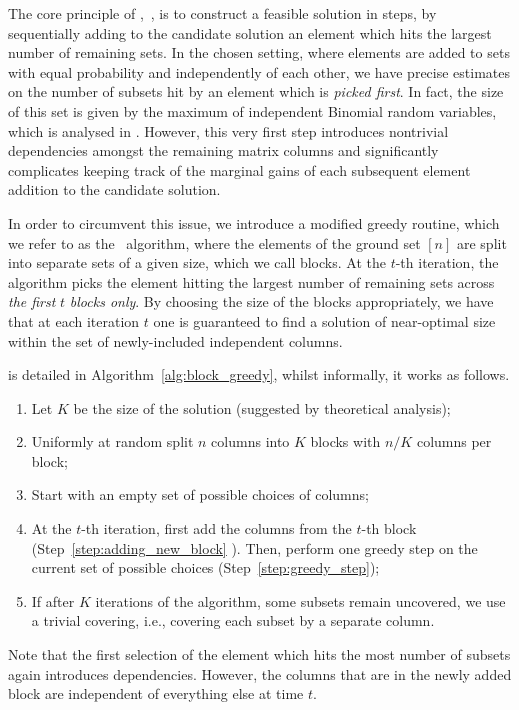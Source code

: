 The core principle of \greedy,~, is to construct a feasible solution in steps, by sequentially adding to the candidate solution an element which hits the largest number of remaining sets. 
In the chosen setting, where elements are added to sets with equal probability and independently of each other, we have precise estimates on the number of subsets hit by an element which is {\it picked first}. 
In fact, the size of this set is given by the maximum of independent Binomial random variables, which is analysed in . 
However, this very first step introduces nontrivial dependencies amongst the remaining matrix columns and significantly complicates keeping track of the marginal gains of each subsequent element addition to the candidate solution.




In order to circumvent this issue, we introduce a modified greedy routine, which we refer to as the \bgreedy\ algorithm, where the elements of the ground set $[n]$ are split into separate sets of a given size, which we call blocks. 
At the \(t\)-th iteration, the algorithm picks the element hitting the largest number of remaining sets across \textit{the first} \(t\) \textit{blocks only}. 
By choosing the size of the blocks appropriately, we have that at each iteration $t$ one is guaranteed to find a solution of near-optimal size within the set of newly-included independent columns. 

\noindent

\bgreedy is detailed in Algorithm~\ref{alg:block_greedy}, whilst informally, it works as follows.
\begin{enumerate}
\item Let \(K\) be the size of the solution (suggested by theoretical analysis);
\item Uniformly at random split \(n\) columns into \(K\) blocks with \(n / K\) columns per block;
\item Start with an empty set of possible choices of columns;
\item At the \(t\)-th iteration, first add the columns
from the \(t\)-th block (Step~\ref{step:adding_new_block} ).
Then, perform one greedy step on the current
set of possible choices (Step~\ref{step:greedy_step});
\item If after \(K\) iterations of the algorithm, some subsets remain uncovered, we use  a trivial covering, i.e., covering each subset by a separate column.
\end{enumerate}
Note that the first selection of the element which hits the most number of subsets again introduces dependencies. 
However, the columns that are in the newly added block are independent of everything else at time \(t\).

